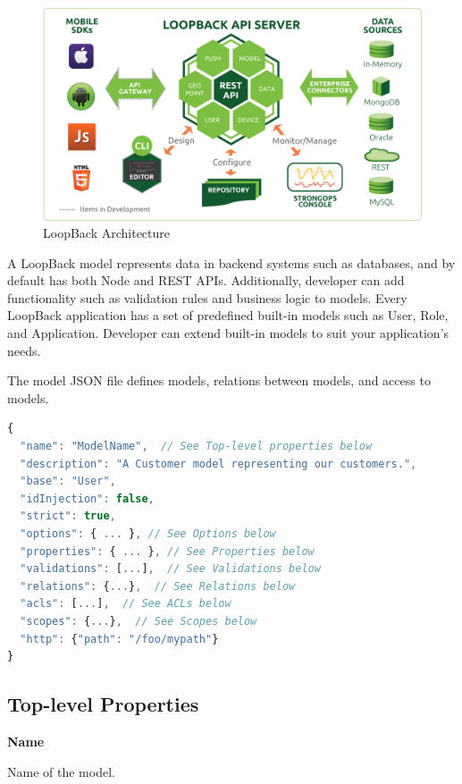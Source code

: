 \begin {figure}[h]
\graphicspath{{images/chapter_TCH/}}
\includegraphics[width=\textwidth]{loopback_1}
\caption{LoopBack Architecture}
\end {figure}



A LoopBack model represents data in backend systems such as databases, and by default has both Node and REST APIs.  Additionally, developer can add functionality such as validation rules and business logic to models.
Every LoopBack application has a set of predefined built-in models such as User, Role, and Application.  Developer can extend built-in models to suit your application's needs.

The model JSON file defines models, relations between models, and access to models. 

\begin{lstlisting}[language=javascript]
{
  "name": "ModelName",  // See Top-level properties below
  "description": "A Customer model representing our customers.",
  "base": "User",
  "idInjection": false,
  "strict": true,
  "options": { ... }, // See Options below
  "properties": { ... }, // See Properties below
  "validations": [...],  // See Validations below
  "relations": {...},  // See Relations below
  "acls": [...],  // See ACLs below
  "scopes": {...},  // See Scopes below
  "http": {"path": "/foo/mypath"}
}
\end{lstlisting}

\subsection{Top-level Properties}

\textbf{Name}

Name of the model.

